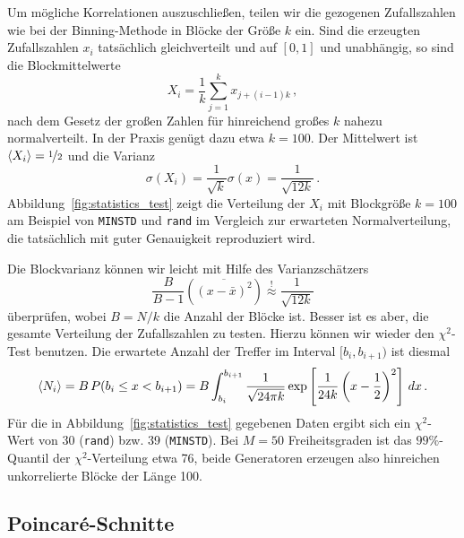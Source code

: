 Um mögliche Korrelationen auszuschließen, teilen wir die gezogenen Zufallszahlen wie bei der Binning-Methode in Blöcke der Größe $k$ ein. 
Sind die erzeugten Zufallszahlen $x_i$ tatsächlich gleichverteilt und
auf $[0,1]$ und unabhängig, so sind die Blockmittelwerte
\begin{equation}
  X_i = \frac{1}{k}\sum_{j=1}^k x_{j + (i-1)k}\,,
\end{equation}
nach dem Gesetz der großen Zahlen für hinreichend großes $k$ nahezu normalverteilt. In der Praxis genügt dazu etwa $k=100$. Der Mittelwert
ist $\left\langle{X_i}\right\rangle = \nicefrac{1}{2}$ und die Varianz
\begin{equation}
  \sigma(X_i) = \frac{1}{\sqrt{k}} \sigma(x) =
  \frac{1}{\sqrt{12 k}}\,.
\end{equation}
Abbildung~\ref{fig:statistics_test} zeigt die Verteilung der $X_i$ mit Blockgröße $k=100$ am Beispiel von \texttt{MINSTD} und \texttt{rand} im Vergleich zur erwarteten Normalverteilung, die tatsächlich mit guter Genauigkeit reproduziert wird.

Die Blockvarianz können wir leicht mit Hilfe des Varianzschätzers
\begin{equation}
  \frac{B}{B-1}\left(\overline{(x - \bar{x})^2}\right) \stackrel{!}{\approx} \frac{1}{\sqrt{12 k}}
\end{equation}
überprüfen, wobei $B=N/k$ die Anzahl der Blöcke ist. Besser ist es aber, die gesamte Verteilung der Zufallszahlen zu testen. Hierzu können wir wieder den $\chi^2$-Test benutzen. Die erwartete Anzahl der Treffer im Interval $[b_i,b_{i+1})$ ist diesmal
\begin{equation}
	\left\langle{N_i}\right\rangle = B\,P(b_i \le x < b_{i+1}) = B\int_{b_i}^{b_{i+1}} \frac{1}{\sqrt{24\pi k}} \exp\left[\frac{1}{24 k} \left(x - \frac{1}{2}\right)^2\right]\,dx\,.
\end{equation}
Für die in Abbildung~\ref{fig:statistics_test} gegebenen Daten ergibt sich ein $\chi^2$-Wert von 30 (\texttt{rand}) bzw. 39 (\texttt{MINSTD}). Bei $M=50$ Freiheitsgraden ist das $99\%$-Quantil der $\chi^2$-Verteilung etwa 76, beide Generatoren erzeugen also hinreichen unkorrelierte Blöcke der Länge 100.

\subsection{Poincar\'e-Schnitte}

